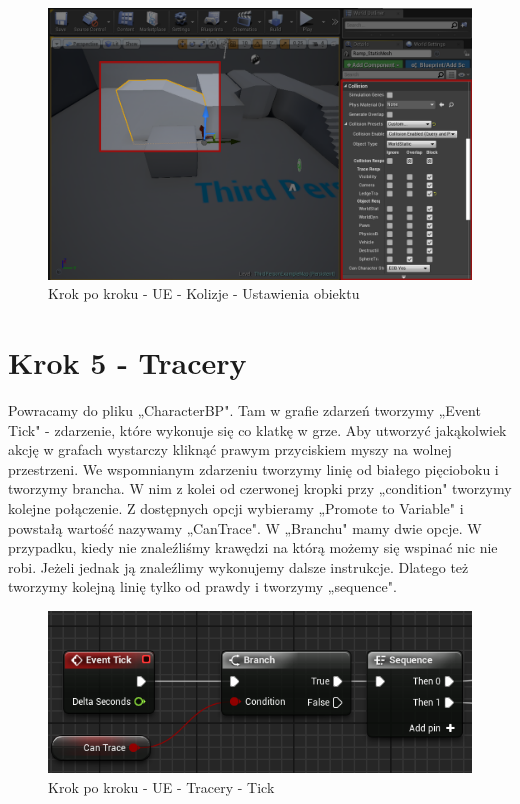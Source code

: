 \documentclass[openright]{xmgr}
\begin{document}
\begin{figure}[!htb]
    \begin{center}
    \includegraphics[scale=0.35]{Screeny/UeKrokPoKroku/UE-Climb-ObjectCollision}
    \end{center}
    \caption{Krok po kroku - UE - Kolizje - Ustawienia obiektu}
\end{figure}

\newpage
\section{Krok 5 - Tracery}

Powracamy do pliku „CharacterBP". Tam w grafie zdarzeń tworzymy „Event Tick" - zdarzenie, które wykonuje się co klatkę w grze. Aby utworzyć jakąkolwiek akcję w grafach wystarczy kliknąć prawym przyciskiem myszy na wolnej przestrzeni. We wspomnianym zdarzeniu tworzymy linię od białego pięcioboku i tworzymy brancha. W nim z kolei od czerwonej kropki przy „condition" tworzymy kolejne połączenie. Z dostępnych opcji wybieramy „Promote to Variable" i powstałą wartość nazywamy „CanTrace".
W „Branchu" mamy dwie opcje. W przypadku, kiedy nie znaleźliśmy krawędzi na którą możemy się wspinać nic nie robi. Jeżeli jednak ją znaleźlimy wykonujemy dalsze instrukcje. Dlatego też tworzymy kolejną linię tylko od prawdy i tworzymy „sequence".

\begin{figure}[!htb]
    \begin{center}
    \includegraphics[scale=0.5]{Screeny/UeKrokPoKroku/UE-Tick}
    \end{center}
    \caption{Krok po kroku - UE - Tracery - Tick}
\end{figure}
\end{document}
